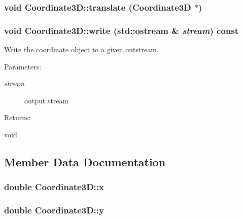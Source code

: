 \subsubsection{\setlength{\rightskip}{0pt plus 5cm}void Coordinate3D::translate (Coordinate3D $\ast$)}\label{classCoordinate3D_a12}


\subsubsection{\setlength{\rightskip}{0pt plus 5cm}void Coordinate3D::write (std::ostream \& {\em stream}) const}\label{classCoordinate3D_a13}


Write the coordinate object to a given outstream. \begin{Desc}
\item[Parameters: ]\par
\begin{description}
\item[{\em 
stream}]output stream \end{description}
\end{Desc}
\begin{Desc}
\item[Returns: ]\par
void \end{Desc}


\subsection{Member Data Documentation}
\subsubsection{\setlength{\rightskip}{0pt plus 5cm}double Coordinate3D::x\hspace{0.3cm}{\tt  [protected]}}\label{classCoordinate3D_n0}


\subsubsection{\setlength{\rightskip}{0pt plus 5cm}double Coordinate3D::y\hspace{0.3cm}{\tt  [protected]}}\label{classCoordinate3D_n1}


